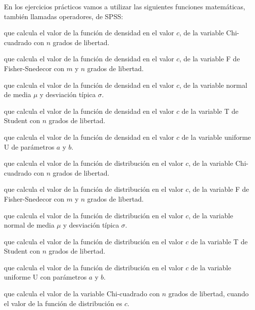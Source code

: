 En los ejercicios prácticos vamos a utilizar las
siguientes funciones matemáticas, también llamadas operadores, de
SPSS:
\begin{description}[leftmargin=*]
\item[PDF.CHISQ $(c,n)$] que calcula el valor de la función de
densidad en el valor $c$, de la variable Chi-cuadrado con $n$
grados de libertad.

\item[PDF.F $(c,m,n)$] que calcula el valor de la función de
densidad en el valor $c$, de la variable F de Fisher-Snedecor con
$m$ y $n$ grados de libertad.

\item[PDF.NORMAL $(c,\mu,\sigma)$] que calcula el valor de la función de
densidad en el valor $c$, de la variable normal de media $\mu$ y
desviación típica $\sigma$.

\item[PDF.T $(c,n)$] que calcula el valor de la función de
densidad en el valor $c$ de la variable T de Student con $n$
grados de libertad.

\item[PDF.UNIFORM $(c,a,b)$] que calcula el valor de la función de
densidad en el valor $c$ de la variable uniforme U de parámetros
$a$ y $b$.

\item[CDF.CHISQ $(c,n)$] que calcula el valor de la función de
distribución en el valor $c$, de la variable Chi-cuadrado con $n$
grados de libertad.

\item[CDF.F $(c,m,n)$] que calcula el valor de la función de
distribución en el valor $c$, de la variable F de Fisher-Snedecor
con $m$ y $n$ grados de libertad.

\item[CDF.NORMAL $(c,\mu,\sigma)$] que calcula el valor de la función de
distribución en el valor $c$, de la variable normal de media $\mu$
y desviación típica $\sigma$.

\item[CDF.T $(c,n)$] que calcula el valor de la función de
distribución en el valor $c$ de la variable T de Student con $n$
grados de libertad.

\item[CDF.UNIFORM $(c,a,b)$] que calcula el valor de la función de
distribución en el valor $c$ de la variable uniforme U con
parámetros $a$ y $b$.

\item[IDF.CHISQ $(c,n)$] que calcula el valor de la variable
Chi-cuadrado con $n$ grados de libertad, cuando el valor de la
función de distribución es $c$.


\end{description}

